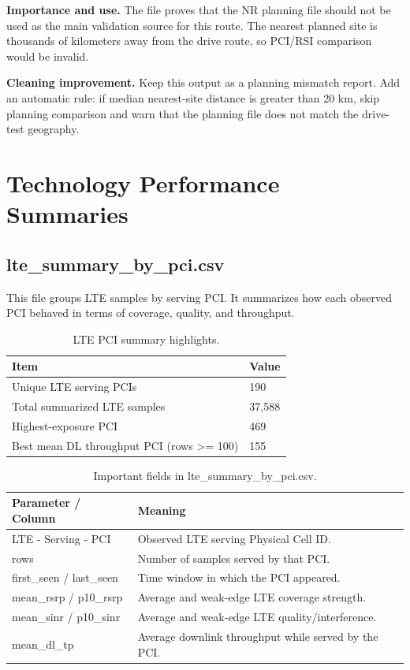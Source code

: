 \documentclass[12pt,a4paper]{article}
\begin{document}
\textbf{Importance and use.} The file proves that the NR planning file should not be used as the main validation source for this route. The nearest planned site is thousands of kilometers away from the drive route, so PCI/RSI comparison would be invalid.

\textbf{Cleaning improvement.} Keep this output as a planning mismatch report. Add an automatic rule: if median nearest-site distance is greater than 20 km, skip planning comparison and warn that the planning file does not match the drive-test geography.


\section{Technology Performance Summaries}

\subsection{lte\_summary\_by\_pci.csv}
This file groups LTE samples by serving PCI. It summarizes how each observed PCI behaved in terms of coverage, quality, and throughput.


\begin{table}[H]
\centering
\begin{tabularx}{0.94\textwidth}{P{5.2cm}Y}
\toprule
\textbf{Item} & \textbf{Value} \\
\midrule
Unique LTE serving PCIs & 190 \\
Total summarized LTE samples & 37,588 \\
Highest-exposure PCI & 469 \\
Best mean DL throughput PCI (rows >= 100) & 155 \\
\bottomrule
\end{tabularx}
\caption{LTE PCI summary highlights.}
\end{table}


\begin{table}[H]
\centering
\begin{tabularx}{\textwidth}{P{0.38\textwidth}Y}
\toprule
\textbf{Parameter / Column} & \textbf{Meaning} \\
\midrule
{\ttfamily LTE -\allowbreak{} Serving -\allowbreak{} PCI} & Observed LTE serving Physical Cell ID. \\
{\ttfamily rows} & Number of samples served by that PCI. \\
{\ttfamily first\_\allowbreak{}seen /\allowbreak{} last\_\allowbreak{}seen} & Time window in which the PCI appeared. \\
{\ttfamily mean\_\allowbreak{}rsrp /\allowbreak{} p10\_\allowbreak{}rsrp} & Average and weak-edge LTE coverage strength. \\
{\ttfamily mean\_\allowbreak{}sinr /\allowbreak{} p10\_\allowbreak{}sinr} & Average and weak-edge LTE quality/interference. \\
{\ttfamily mean\_\allowbreak{}dl\_\allowbreak{}tp} & Average downlink throughput while served by the PCI. \\
\bottomrule
\end{tabularx}
\caption{Important fields in lte\_summary\_by\_pci.csv.}
\end{table}
\end{document}

